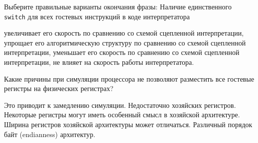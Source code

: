 \begin{questions}
\question[3] Выберите правильные варианты окончания фразы: Наличие единственного \texttt{switch} для всех гостевых инструкций в коде интерпретатора
\begin{choices}
    \choice увеличивает его скорость по сравнению со схемой сцепленной интерпретации,
    \choice упрощает его алгоритмическую структуру по сравнению со схемой сцепленной интерпретации,
    \correctchoice уменьшает его скорость по сравнению со схемой сцепленной интерпретации,
    \choice не влияет на скорость работы интерпретатора.
\end{choices}

\question[3] Какие причины при симуляции процессора не позволяют разместить все гостевые регистры на физических регистрах?
\begin{choices}
    \choice Это приводит к замедлению симуляции.
    \correctchoice Недостаточно хозяйских регистров.
    \correctchoice Некоторые регистры могут иметь особенный смысл в хозяйской архитектуре.
    \correctchoice Ширина регистров хозяйской архитектуры может отличаться.
    \choice Различный порядок байт (endianness) архитектур.
\end{choices}

\end{questions}


